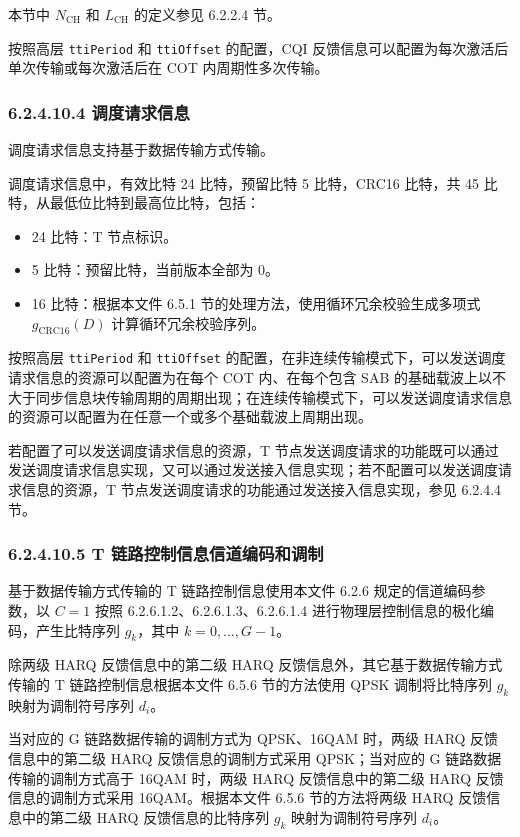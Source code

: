 \documentclass[11pt,a4paper]{ctexart}
\begin{document}
本节中 $N_{\mathrm{CH}}$ 和 $L_{\mathrm{CH}}$ 的定义参见 6.2.2.4 节。

按照高层 \texttt{ttiPeriod} 和 \texttt{ttiOffset} 的配置，CQI 反馈信息可以配置为每次激活后单次传输或每次激活后在 COT 内周期性多次传输。

\subsubsection{6.2.4.10.4 调度请求信息}

调度请求信息支持基于数据传输方式传输。

调度请求信息中，有效比特 24 比特，预留比特 5 比特，CRC16 比特，共 45 比特，从最低位比特到最高位比特，包括：
\begin{itemize}[nosep]
  \item 24 比特：T 节点标识。
  \item 5 比特：预留比特，当前版本全部为 0。
  \item 16 比特：根据本文件 6.5.1 节的处理方法，使用循环冗余校验生成多项式 $g_{\mathrm{CRC16}}(D)$ 计算循环冗余校验序列。
\end{itemize}

按照高层 \texttt{ttiPeriod} 和 \texttt{ttiOffset} 的配置，在非连续传输模式下，可以发送调度请求信息的资源可以配置为在每个 COT 内、在每个包含 SAB 的基础载波上以不大于同步信息块传输周期的周期出现；在连续传输模式下，可以发送调度请求信息的资源可以配置为在任意一个或多个基础载波上周期出现。

若配置了可以发送调度请求信息的资源，T 节点发送调度请求的功能既可以通过发送调度请求信息实现，又可以通过发送接入信息实现；若不配置可以发送调度请求信息的资源，T 节点发送调度请求的功能通过发送接入信息实现，参见 6.2.4.4 节。

\subsubsection{6.2.4.10.5 T 链路控制信息信道编码和调制}

基于数据传输方式传输的 T 链路控制信息使用本文件 6.2.6 规定的信道编码参数，以 $C = 1$ 按照 6.2.6.1.2、6.2.6.1.3、6.2.6.1.4 进行物理层控制信息的极化编码，产生比特序列 $g_k$，其中 $k = 0, \ldots, G-1$。

除两级 HARQ 反馈信息中的第二级 HARQ 反馈信息外，其它基于数据传输方式传输的 T 链路控制信息根据本文件 6.5.6 节的方法使用 QPSK 调制将比特序列 $g_k$ 映射为调制符号序列 $d_i$。

当对应的 G 链路数据传输的调制方式为 QPSK、16QAM 时，两级 HARQ 反馈信息中的第二级 HARQ 反馈信息的调制方式采用 QPSK；当对应的 G 链路数据传输的调制方式高于 16QAM 时，两级 HARQ 反馈信息中的第二级 HARQ 反馈信息的调制方式采用 16QAM。根据本文件 6.5.6 节的方法将两级 HARQ 反馈信息中的第二级 HARQ 反馈信息的比特序列 $g_k$ 映射为调制符号序列 $d_i$。
\end{document}
